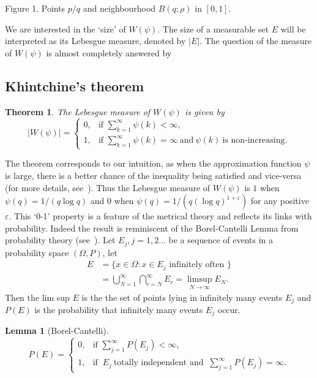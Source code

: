 \documentclass[reqno]{amsart}
\newtheorem{lem}{Lemma}
\newtheorem{thm}{Theorem}
\newcommand{\e}{\varepsilon}
\newcommand{\0}{{\mathbf{0}}}
\def\Bqr{B(q;\rho)}
\begin{document}
  \begin{center}
\small{Figure 1. Points $p/q$ and neighbourhood
  $\Bqr$ in $[0,1]$.}
\end{center}
\vspace{0,1in} We are interested in the `size' of $W(\psi)$.  The size
of a measurable set $E$ will be interpreted as its Lebesgue measure,
denoted by $|E|$.  The question of the measure of $W(\psi)$ is almost
completely answered by
\subsection{Khintchine's theorem}
\begin{thm}
  The Lebesgue measure of $W(\psi)$ is given by
  \begin{equation*}
    |W(\psi)| = \begin{cases} 0, 
           &\text{if } \sum_{k=1}^\infty \psi(k)<\infty, \\
1,
          &\text{if }  \sum_{k=1}^\infty \psi(k)=\infty 
\ \text{and}\ \psi(k) \ \text{is non-increasing}.
                  \end{cases}
  \end{equation*}
\end{thm}
The theorem corresponds to our intuition, as when the approximation
function $\psi$ is large,  there is a better chance of the
inequality being satisfied and vice-versa (for more details,
see~\cite{Casselshort,Sprindzuk}).  Thus the Lebesgue measure of
$W(\psi)$ is $1$ when $\psi(q) = 1/(q \log q)$ and $0$ when $\psi(q) =
1/(q(\log q)^{1+\e})$ for any positive $\e$.  This `0-1' property is a
feature of the metrical theory and reflects its links with
probability.  Indeed the result is reminiscent of the Borel-Cantelli
Lemma from probability theory (see~\cite{KandT}).  Let $E_j, j=1,2
\dots$ be a sequence of events in a probability space $(\Omega, P)$,
let
\begin{align*}
E&=\{x\in\Omega\colon x\in E_j \text{ infinitely often }\} \\
&=\bigcup_{N=1}^\infty \bigcap_{r=N}^\infty
  E_r=\limsup_{N\to\infty} E_N.
\end{align*}
Then the lim sup $E$ is the the set of points lying in infinitely many
events $E_j$ and $P(E)$ is the probability that infinitely many events
$E_j$ occur. 
\begin{lem}[Borel-Cantelli]
  \label{lem:BC}
  \begin{equation*}
P(E)= \begin{cases} 0 , &\text{if } \sum_{j=1}^\infty P(E_j)<\infty, \\
                 1, &\text{if } \ E_j \ \text {totally independent and
                 } \ \sum_{j=1}^\infty P(E_j)=\infty.
                 \end{cases}
  \end{equation*}
\end{lem}
\end{document}
